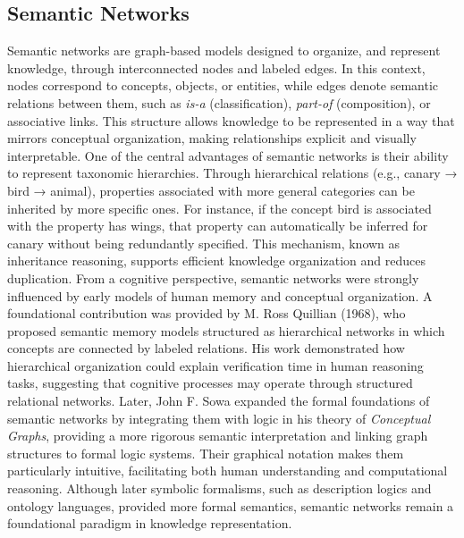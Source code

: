 \documentclass[12pt,a4paper]{report}
\begin{document}
\subsection{Semantic Networks}
Semantic networks are graph-based models designed to organize, and represent knowledge, through interconnected nodes and labeled edges. 
In this context, nodes correspond to concepts, objects, or entities, while edges denote semantic relations between them, such as \textit{is-a} (classification), \textit{part-of } (composition), or associative links. This structure allows knowledge to be represented in a way that mirrors conceptual organization, making relationships explicit and visually interpretable.
One of the central advantages of semantic networks is their ability to represent taxonomic hierarchies. Through hierarchical relations (e.g., canary → bird → animal), properties associated with more general categories can be inherited by more specific ones. For instance, if the concept bird is associated with the property has wings, that property can automatically be inferred for canary without being redundantly specified. This mechanism, known as inheritance reasoning, supports efficient knowledge organization and reduces duplication.
From a cognitive perspective, semantic networks were strongly influenced by early models of human memory and conceptual organization. A foundational contribution was provided by M. Ross Quillian (1968), who proposed semantic memory models structured as hierarchical networks in which concepts are connected by labeled relations. His work demonstrated how hierarchical organization could explain verification time in human reasoning tasks, suggesting that cognitive processes may operate through structured relational networks.
Later, John F. Sowa expanded the formal foundations of semantic networks by integrating them with logic in his theory of \textit{Conceptual Graphs}, providing a more rigorous semantic interpretation and linking graph structures to formal logic systems.
Their graphical notation makes them particularly intuitive, facilitating both human understanding and computational reasoning. Although later symbolic formalisms, such as description logics and ontology languages,  provided more formal semantics, semantic networks remain a foundational paradigm in knowledge representation.
\end{document}
